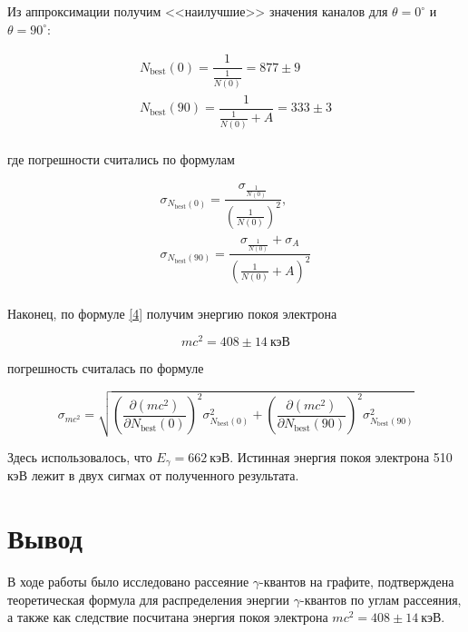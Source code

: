 \documentclass[15pt,a5paper,reqno]{article}
\begin{document}
Из аппроксимации получим <<наилучшие>> значения каналов для $\theta = 0^\circ$ и $\theta = 90^\circ$:

\[\begin{array}{l}
N_{\text{best}}(0) = \dfrac{1}{\frac{1}{N(0)}} = 877 \pm 9 \\
N_{\text{best}}(90) = \dfrac{1}{\frac{1}{N(0)}+A} = 333 \pm 3\\
\end{array}
\]

где погрешности считались по формулам
 
\[
\begin{array}{l}
\sigma_{N_{\text{best}}(0)} = \dfrac{\sigma_{\frac{1}{N(0)}}}{(\frac{1}{N(0)})^2},\\[14pt]
\sigma_{N_{\text{best}}(90)} = \dfrac{\sigma_{\frac{1}{N(0)}} + \sigma_{A}}{(\frac{1}{N(0)}+A)^2} \\
\end{array}
\]

Наконец, по формуле \eqref{4} получим энергию покоя электрона
    
    \[ mc^2 = 408 \pm 14~\text{кэВ} \]

погрешность считалась по формуле

\[\sigma_{mc^2} = \sqrt{ \left( \dfrac{\partial (mc^2)}{\partial N_{\text{best}}(0)} \right)^2 \sigma_{N_{\text{best}}(0)}^2 +\left( \dfrac{\partial (mc^2)}{\partial N_{\text{best}}(90)} \right)^2 \sigma_{N_{\text{best}}(90)}^2 }\]

Здесь использовалось, что $E_\gamma = 662~\text{кэВ}$. Истинная энергия покоя электрона 510 кэВ лежит в двух сигмах от полученного результата.

\section{Вывод}

В ходе работы было исследовано рассеяние $\gamma$-квантов на графите, подтверждена теоретическая формула для распределения энергии $\gamma$-квантов по углам рассеяния, а также как следствие посчитана энергия покоя электрона $mc^2 = 408 \pm 14 ~\text{кэВ}$.
\end{document}
